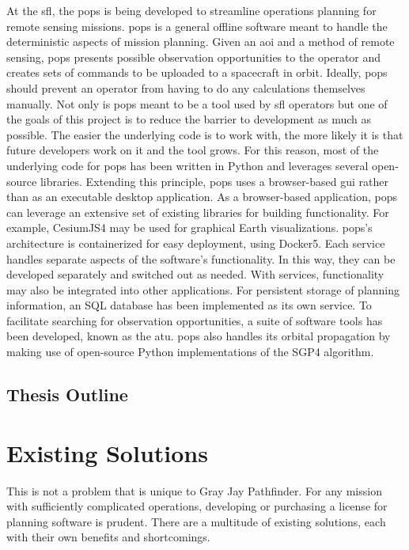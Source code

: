 At the \gls{sfl}, the \gls{pops} is being developed to streamline operations
planning for remote sensing missions. \gls{pops} is a general offline software
meant to handle the deterministic aspects of mission planning.  Given an
\gls{aoi} and a method of remote sensing, \gls{pops} presents possible
observation opportunities to the operator and creates sets of commands to be
uploaded to a spacecraft in orbit.  Ideally, \gls{pops} should prevent an
operator from having to do any calculations themselves manually. Not only is
\gls{pops} meant to be a tool used by \gls{sfl} operators but one of the goals
of this project is to reduce the barrier to development as much as possible.
The easier the underlying code is to work with, the more likely it is that
future developers work on it and the tool grows. For this reason, most of the
underlying code for \gls{pops} has been written in Python and leverages several
open-source libraries.  Extending this principle, \gls{pops} uses a
browser-based \gls{gui} rather than as an executable desktop application. As a
browser-based application, \gls{pops} can leverage an extensive set of existing
libraries for building functionality.  For example, CesiumJS4 may be used for
graphical Earth visualizations.  \gls{pops}’s architecture is containerized for
easy deployment, using Docker5.  Each service handles separate aspects of the
software’s functionality.  In this way, they can be developed separately and
switched out as needed. With services, functionality may also be integrated
into other applications. For persistent storage of planning information, an SQL
database has been implemented as its own service.  To facilitate searching for
observation opportunities, a suite of software tools has been developed, known
as the \gls{atu}.  \gls{pops} also handles its orbital propagation by making use of
open-source Python implementations of the SGP4 algorithm. 



\subsection*{Thesis Outline} 


\section{Existing Solutions}\label{sec:exsoln}

This is not a problem that is unique to Gray Jay Pathfinder.
For any mission with sufficiently complicated operations, developing or purchasing a license for planning software is prudent.
There are a multitude of existing solutions, each with their own benefits and shortcomings.





